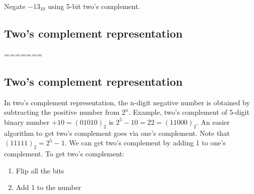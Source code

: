 \noindent Negate $-13_{10}$ using 5-bit two's complement.
\vspace{10em}



\subsection{Two's complement representation}

=======

\subsection{Two's complement representation}

In two's complement representation, the n-digit negative number is obtained by
subtracting the positive number from $2^{n}$. Example, two's
complement of 5-digit binary number $+10 = (01010)_2$ is $2^5 - 10 = 22 =
(11000)_2$. An easier algorithm to get two's complement goes via one's
complement. Note that $(11111)_2 = 2^5-1$. We can get two's complement by adding
1 to one's complement. To get two's complement:
\begin{enumerate}
  \item Flip all the bits
  \item Add 1 to the number
\end{enumerate}

